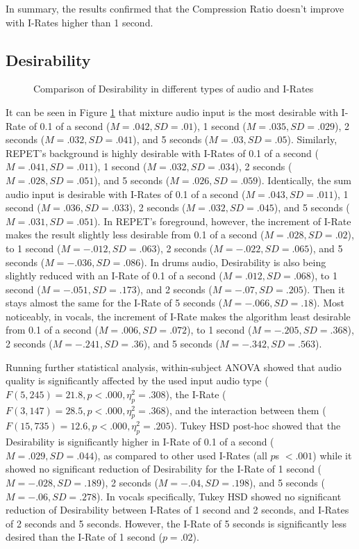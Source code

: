 In summary, the results confirmed that the Compression Ratio doesn't improve with I-Rates higher than 1 second.

\subsection{Desirability}

\begin{figure}[ht]
  
  \caption{Comparison of Desirability in different types of audio and I-Rates}
  \label{fig:irate-desirable}
\end{figure}

It can be seen in Figure \ref{fig:irate-desirable} that mixture audio input is the most desirable with I-Rate of 0.1 of a second ($M=.042, SD=.01$), 1 second ($M=.035, SD=.029$), 2 seconds ($M=.032, SD=.041$), and 5 seconds ($M=.03, SD=.05$).
Similarly, REPET's background is highly desirable with I-Rates of 0.1 of a second ($M=.041, SD=.011$), 1 second ($M=.032, SD=.034$), 2 seconds ($M=.028, SD=.051$), and 5 seconds ($M=.026, SD=.059$).
Identically, the sum audio input is desirable with I-Rates of 0.1 of a second ($M=.043, SD=.011$), 1 second ($M=.036, SD=.033$), 2 seconds ($M=.032, SD=.045$), and 5 seconds ($M=.031, SD=.051$).
In REPET's foreground, however, the increment of I-Rate makes the result slightly less desirable from 0.1 of a second ($M=.028, SD=.02$), to 1 second ($M=-.012, SD=.063$), 2 seconds ($M=-.022, SD=.065$), and 5 seconds ($M=-.036, SD=.086$).
In drums audio, Desirability is also being slightly reduced with an I-Rate of 0.1 of a second ($M=.012, SD=.068$), to 1 second ($M=-.051, SD=.173$), and 2 seconds ($M=-.07, SD=.205$). Then it stays almost the same for the I-Rate of 5 seconds ($M=-.066, SD=.18$).
Most noticeably, in vocals, the increment of I-Rate makes the algorithm least desirable from 0.1 of a second ($M=.006, SD=.072$), to 1 second ($M=-.205, SD=.368$), 2 seconds ($M=-.241, SD=.36$), and 5 seconds ($M=-.342, SD=.563$).

Running further statistical analysis,  within-subject ANOVA showed that audio quality is significantly affected by the used input audio type ($F(5,245)=21.8, p<.000, \eta_{p}^{2}=.308$), the I-Rate ($F(3,147)=28.5, p<.000, \eta_{p}^{2}=.368$), and the interaction between them ($F(15,735)=12.6, p<.000, \eta_{p}^{2}=.205$).
Tukey HSD post-hoc showed that the Desirability is significantly higher in I-Rate of 0.1 of a second ($M=.029, SD=.044$), as compared to other used I-Rates (all $p$s $<.001$) while it showed no significant reduction of Desirability for the I-Rate of 1 second ($M=-.028, SD=.189$), 2 seconds ($M=-.04, SD=.198$), and 5 seconds ($M=-.06, SD=.278$). In vocals specifically, Tukey HSD showed no significant reduction of Desirability between I-Rates of 1 second and 2 seconds, and I-Rates of 2 seconds and 5 seconds. However, the I-Rate of 5 seconds is significantly less desired than the I-Rate of 1 second ($p=.02$).

